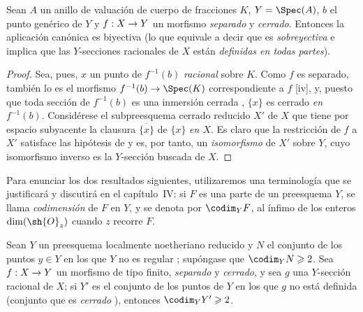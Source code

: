 \documentclass[oneside,10pt]{amsart}
\makeatletter
\renewcommand{\geq}{\geqslant}
\newcommand{\ega@arrow}[2]{\mathchoice{#1}{#2}{#2}{#2}}
\renewcommand{\to}{\ega@arrow{\longrightarrow}{\rightarrow}}
\newcommand{\oldpage}[2][]{\marginnote{\normalfont\footnotesize\textbf{#1}~|~#2}\ignorespaces}
\let\EGAOriginalLabel\label
\renewcommand{\label}[1]{\phantomsection\EGAOriginalLabel{#1}}
\makeatother
\begin{document}

\begin{proposition}[7.3.3]
\label{II.7.3.3}
Sean $A$ un anillo de valuación de cuerpo de fracciones $K$, $Y=\Spec(A)$, $b$ el punto genérico de $Y$ y $f:X\to Y$ un morfismo \emph{separado} y \emph{cerrado}.
Entonces la aplicación canónica \textup{} es biyectiva \textup{(lo que equivale a decir que es \emph{sobreyectiva} e implica que las $Y$-secciones racionales de $X$ están \emph{definidas en todas partes})}.
\end{proposition}

\begin{proof}
Sea, pues, $x$ un punto de $f^{-1}(b)$ \emph{racional} sobre $K$.
Como $f$ es separado, también lo es el morfismo $f^{-1}(b)\to\Spec(K)$ correspondiente a $f$ [iv], y, puesto que toda sección de $f^{-1}(b)$ es una inmersión cerrada , $\{x\}$ es cerrado \emph{en $f^{-1}(b)$}.
Considérese el subpreesquema cerrado reducido $X'$ de $X$ que tiene por espacio subyacente la clausura $\overline{\{x\}}$ de $\{x\}$ \emph{en $X$}.
Es claro que la restricción de $f$ a $X'$ satisface las hipótesis de  y es, por tanto, un \emph{isomorfismo} de $X'$ sobre $Y$, cuyo isomorfismo inverso es la $Y$-sección buscada de $X$.
\end{proof}

\begin{env}[7.3.4]
\label{II.7.3.4}
Para enunciar los dos resultados siguientes, utilizaremos una terminología que se justificará y discutirá en el capítulo~IV:
si $F$ es una parte
\oldpage[II]{144}
de un preesquema $Y$, se llama \emph{codimensión} de $F$ en $Y$, y se denota por $\codim_Y F$, al ínfimo de los enteros $\dim(\sh{O}_z)$ cuando $z$ recorre $F$.
\end{env}

\begin{corollary}[7.3.5]
\label{II.7.3.5}
Sean $Y$ un preesquema localmente noetheriano reducido y $N$ el conjunto de los puntos $y\in Y$ en los que $Y$ no es regular \textup{};
supóngase que $\codim_Y N\geq2$.
Sea $f:X\to Y$ un morfismo de tipo finito, \emph{separado} y \emph{cerrado}, y sea $g$ una $Y$-sección racional de $X$;
si $Y'$ es el conjunto de los puntos de $Y$ en los que $g$ no está definida \textup{(conjunto que es \emph{cerrado} )}, entonces $\codim_Y Y'\geq2$.
\end{corollary}
\end{document}
